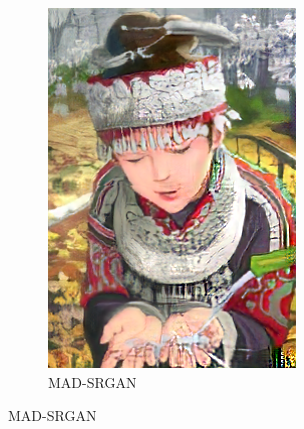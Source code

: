 \documentclass[12pt,a4paper]{article}
\begin{document}
\begin{figure}[H]
\begin{subfigure}{0.2\textwidth}
                \includegraphics[width=\textwidth]{images/samples/img-4-mad-srgan.png}
                \caption*{MAD-SRGAN}
            \end{subfigure}
        \end{figure}
\end{document}
